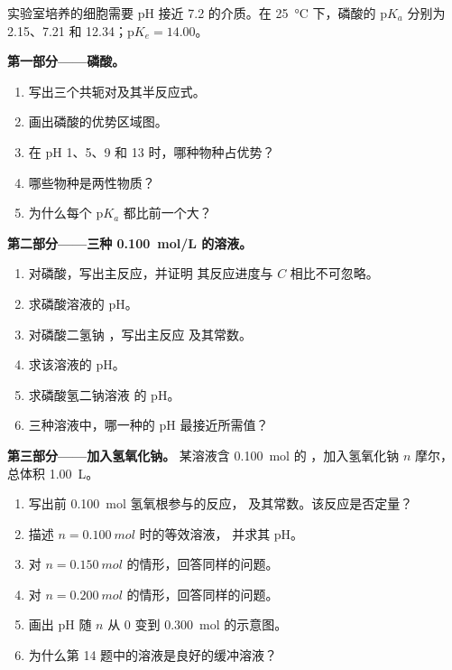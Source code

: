 \begin{problem}
\label{pb:b1:predominant-reaction:1}
实验室培养的细胞需要 pH 接近 7.2 的介质。在
\qty{25}{\celsius} 下，磷酸的 $\mathrm{p}K_a$ 分别为 2.15、7.21 和
12.34；$\mathrm{p}K_e = 14.00$。

\medskip
\noindent\textbf{第一部分——磷酸。}
\begin{enumerate}
  \item 写出三个共轭对及其半反应式。
  \item 画出磷酸的优势区域图。
  \item 在 pH 1、5、9 和 13 时，哪种物种占优势？
  \item 哪些物种是两性物质？
  \item 为什么每个 $\mathrm{p}K_a$ 都比前一个大？
\end{enumerate}

\medskip
\noindent\textbf{第二部分——三种 \qty{0.100}{mol/L} 的溶液。}
\begin{enumerate}[resume]
  \item 对磷酸，写出主反应，并证明
        其反应进度与 $C$ 相比不可忽略。
  \item 求磷酸溶液的 pH。
  \item 对磷酸二氢钠 ，写出主反应
        及其常数。
  \item 求该溶液的 pH。
  \item 求磷酸氢二钠溶液
         的 pH。
  \item 三种溶液中，哪一种的 pH 最接近所需值？
\end{enumerate}

\medskip
\noindent\textbf{第三部分——加入氢氧化钠。}
某溶液含 \qty{0.100}{mol} 的 ，加入氢氧化钠
$n$ 摩尔，总体积 \qty{1.00}{L}。
\begin{enumerate}[resume]
  \item 写出前 \qty{0.100}{mol} 氢氧根参与的反应，
        及其常数。该反应是否定量？
  \item 描述 $n = \qty{0.100}{mol}$ 时的等效溶液，
        并求其 pH。
  \item 对 $n = \qty{0.150}{mol}$ 的情形，回答同样的问题。
  \item 对 $n = \qty{0.200}{mol}$ 的情形，回答同样的问题。
  \item 画出 pH 随 $n$ 从 0 变到 \qty{0.300}{mol} 的示意图。
  \item 为什么第 14 题中的溶液是良好的缓冲溶液？
\end{enumerate}


\end{problem}
